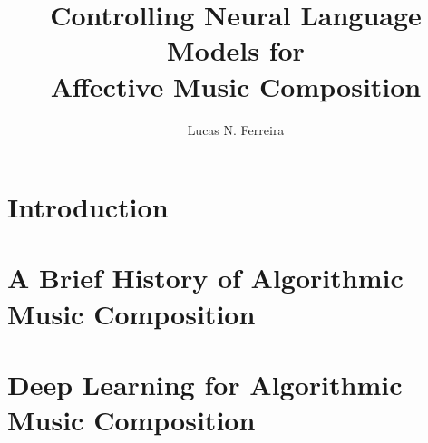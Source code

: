 \documentclass[11pt]{ucscthesis}
\begin{document}

\title{Controlling Neural Language Models for \\ Affective Music Composition}
\author{Lucas N. Ferreira}
\deanlinethree{}

\begin{frontmatter}

\maketitle
\copyrightpage

\tableofcontents
\listoffigures
\listoftables

\begin{abstract}

\end{abstract}

\begin{dedication}

\end{dedication}

\begin{acknowledgements}

\end{acknowledgements}

\end{frontmatter}


\chapter{Introduction}
\label{ch:intro}


\chapter{A Brief History of Algorithmic Music Composition}
\label{ch:amc}


\chapter{Deep Learning for Algorithmic Music Composition}
\label{ch:ml}

\end{document}
